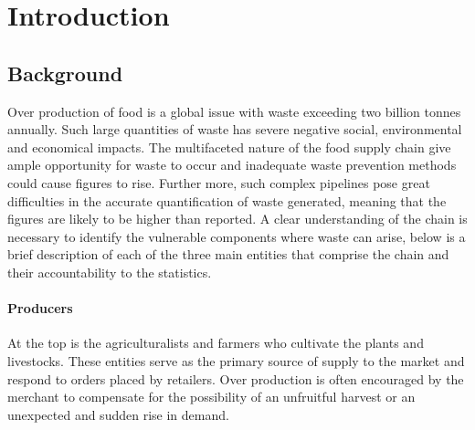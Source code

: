 \documentclass[a4paper, 11pt]{article}
\begin{document}
\clearpage
\thispagestyle{empty}
\newpage

\section{Introduction}

\subsection{Background}
Over production of food is a global issue with waste exceeding two billion tonnes annually\cite{waste}. Such large quantities of waste has severe negative social, environmental and economical impacts. The multifaceted nature of the food supply chain give ample opportunity for waste to occur and inadequate waste prevention methods could cause figures to rise.\cite{FoodWaste} Further more, such complex pipelines pose great difficulties in the accurate quantification of waste generated, meaning that the figures are likely to be higher than reported.\cite{waste} A clear understanding of the chain is necessary to identify the vulnerable components where waste can arise, below is a brief description of each of the three main entities that comprise the chain and their accountability to the statistics.

\paragraph{Producers}At the top is the agriculturalists and farmers who cultivate the plants and livestocks. These entities serve as the primary source of supply to the market and respond to orders placed by retailers. Over production is often encouraged by the merchant to compensate for the possibility of an unfruitful harvest or an unexpected and sudden rise in demand.\cite{waste}
\end{document}
